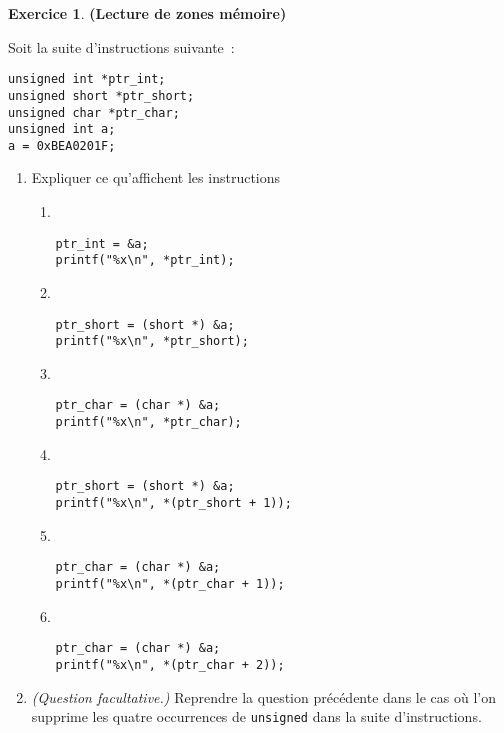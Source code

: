 \documentclass[12pt]{article}
\theoremstyle{definition}
\newtheorem{Exercice}{Exercice}
\begin{document}
\begin{Exercice} {\bf (Lecture de zones mémoire)}\smallskip

Soit la suite d'instructions suivante~:
\begin{lstlisting}
unsigned int *ptr_int;
unsigned short *ptr_short;
unsigned char *ptr_char;
unsigned int a;
a = 0xBEA0201F;
\end{lstlisting}
\begin{enumerate}
    \item Expliquer ce qu'affichent les instructions
    \begin{multicols}{2}
    \begin{enumerate}
        \item ~
\begin{lstlisting}
ptr_int = &a;
printf("%x\n", *ptr_int);
\end{lstlisting}
    \smallskip

    \item ~
\begin{lstlisting}
ptr_short = (short *) &a;
printf("%x\n", *ptr_short);
\end{lstlisting}
    \smallskip

    \item ~
\begin{lstlisting}
ptr_char = (char *) &a;
printf("%x\n", *ptr_char);
\end{lstlisting}
    \smallskip

    \item ~
\begin{lstlisting}
ptr_short = (short *) &a;
printf("%x\n", *(ptr_short + 1));
\end{lstlisting}
    \smallskip

    \item ~
\begin{lstlisting}
ptr_char = (char *) &a;
printf("%x\n", *(ptr_char + 1));
\end{lstlisting}
    \smallskip

    \item ~
\begin{lstlisting}
ptr_char = (char *) &a;
printf("%x\n", *(ptr_char + 2));
\end{lstlisting}
    \end{enumerate}
    \end{multicols}

    \item {\em (Question facultative.)} Reprendre la question
    précédente dans le cas où l'on supprime les quatre occurrences
    de {\tt unsigned} dans la suite d'instructions.
\end{enumerate}
\end{Exercice}
\bigskip
\end{document}
